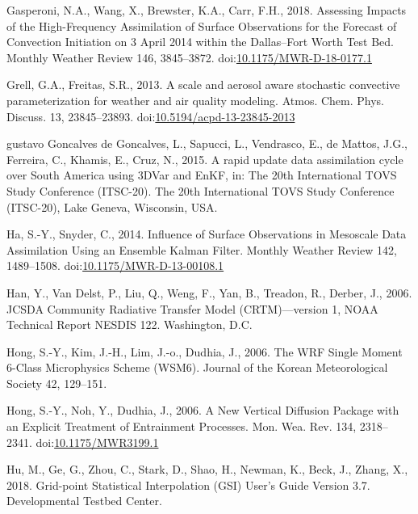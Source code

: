 \documentclass[final,5p,times,twocolumn,authoryear]{elsarticle} %
\begin{document}
\leavevmode\hypertarget{ref-gasperoni2018}{}%
Gasperoni, N.A., Wang, X., Brewster, K.A., Carr, F.H., 2018. Assessing Impacts of the High-Frequency Assimilation of Surface Observations for the Forecast of Convection Initiation on 3 April 2014 within the Dallas--Fort Worth Test Bed. Monthly Weather Review 146, 3845--3872. doi:\href{https://doi.org/10.1175/MWR-D-18-0177.1}{10.1175/MWR-D-18-0177.1}

\leavevmode\hypertarget{ref-grell2013}{}%
Grell, G.A., Freitas, S.R., 2013. A scale and aerosol aware stochastic convective parameterization for weather and air quality modeling. Atmos. Chem. Phys. Discuss. 13, 23845--23893. doi:\href{https://doi.org/10.5194/acpd-13-23845-2013}{10.5194/acpd-13-23845-2013}

\leavevmode\hypertarget{ref-goncalvesdegoncalves2015}{}%
gustavo Goncalves de Goncalves, L., Sapucci, L., Vendrasco, E., de Mattos, J.G., Ferreira, C., Khamis, E., Cruz, N., 2015. A rapid update data assimilation cycle over South America using 3DVar and EnKF, in: The 20th International TOVS Study Conference (ITSC-20). The 20th International TOVS Study Conference (ITSC-20), Lake Geneva, Wisconsin, USA.

\leavevmode\hypertarget{ref-ha2014}{}%
Ha, S.-Y., Snyder, C., 2014. Influence of Surface Observations in Mesoscale Data Assimilation Using an Ensemble Kalman Filter. Monthly Weather Review 142, 1489--1508. doi:\href{https://doi.org/10.1175/MWR-D-13-00108.1}{10.1175/MWR-D-13-00108.1}

\leavevmode\hypertarget{ref-han2006}{}%
Han, Y., Van Delst, P., Liu, Q., Weng, F., Yan, B., Treadon, R., Derber, J., 2006. JCSDA Community Radiative Transfer Model (CRTM)---version 1, NOAA Technical Report NESDIS 122. Washington, D.C.

\leavevmode\hypertarget{ref-hong2006a}{}%
Hong, S.-Y., Kim, J.-H., Lim, J.-o., Dudhia, J., 2006. The WRF Single Moment 6-Class Microphysics Scheme (WSM6). Journal of the Korean Meteorological Society 42, 129--151.

\leavevmode\hypertarget{ref-hong2006}{}%
Hong, S.-Y., Noh, Y., Dudhia, J., 2006. A New Vertical Diffusion Package with an Explicit Treatment of Entrainment Processes. Mon. Wea. Rev. 134, 2318--2341. doi:\href{https://doi.org/10.1175/MWR3199.1}{10.1175/MWR3199.1}

\leavevmode\hypertarget{ref-hu2018}{}%
Hu, M., Ge, G., Zhou, C., Stark, D., Shao, H., Newman, K., Beck, J., Zhang, X., 2018. Grid-point Statistical Interpolation (GSI) User's Guide Version 3.7. Developmental Testbed Center.
\end{document}
